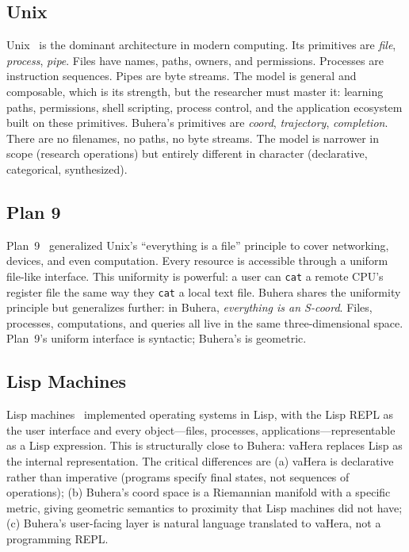 \documentclass[11pt,twocolumn,a4paper]{article}
\begin{document}
\subsection{Unix}
Unix~\cite{ritchie1974unix,tanenbaum2015modern} is the dominant architecture in modern computing. Its primitives are \emph{file}, \emph{process}, \emph{pipe}. Files have names, paths, owners, and permissions. Processes are instruction sequences. Pipes are byte streams. The model is general and composable, which is its strength, but the researcher must master it: learning paths, permissions, shell scripting, process control, and the application ecosystem built on these primitives. Buhera's primitives are \emph{coord}, \emph{trajectory}, \emph{completion}. There are no filenames, no paths, no byte streams. The model is narrower in scope (research operations) but entirely different in character (declarative, categorical, synthesized).

\subsection{Plan 9}
Plan~9~\cite{pike1995plan9} generalized Unix's ``everything is a file'' principle to cover networking, devices, and even computation. Every resource is accessible through a uniform file-like interface. This uniformity is powerful: a user can \texttt{cat} a remote CPU's register file the same way they \texttt{cat} a local text file. Buhera shares the uniformity principle but generalizes further: in Buhera, \emph{everything is an S-coord}. Files, processes, computations, and queries all live in the same three-dimensional space. Plan~9's uniform interface is syntactic; Buhera's is geometric.

\subsection{Lisp Machines}
Lisp machines~\cite{knight1974cons,bawden1977lisp} implemented operating systems in Lisp, with the Lisp REPL as the user interface and every object---files, processes, applications---representable as a Lisp expression. This is structurally close to Buhera: vaHera replaces Lisp as the internal representation. The critical differences are (a) vaHera is declarative rather than imperative (programs specify final states, not sequences of operations); (b) Buhera's coord space is a Riemannian manifold with a specific metric, giving geometric semantics to proximity that Lisp machines did not have; (c) Buhera's user-facing layer is natural language translated to vaHera, not a programming REPL.
\end{document}
